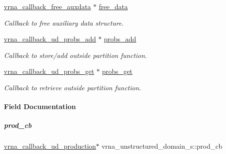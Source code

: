 \begin{DoxyCompactItemize}
\mbox{\hyperlink{group__fold__compound_ga7806651f51b195013839a218b3bbd5a3}{vrna\+\_\+callback\+\_\+free\+\_\+auxdata}} $\ast$ \mbox{\hyperlink{group__domains__up_a21b3084846902172858bc53f113d05a4}{free\+\_\+data}}
\begin{DoxyCompactList}\small\item\em Callback to free auxiliary data structure. \end{DoxyCompactList}\item 
\mbox{\label{group__domains__up_a457b43dfab7f4321b5d7a84e5deea5d7}} 
\mbox{\hyperlink{group__domains__up_gab10498abc84fcaf336aca8f8d7d42eb2}{vrna\+\_\+callback\+\_\+ud\+\_\+probs\+\_\+add}} $\ast$ \mbox{\hyperlink{group__domains__up_a457b43dfab7f4321b5d7a84e5deea5d7}{probs\+\_\+add}}
\begin{DoxyCompactList}\small\item\em Callback to store/add outside partition function. \end{DoxyCompactList}\item 
\mbox{\label{group__domains__up_a0b155283bccf65c5253f31e0211ae8ff}} 
\mbox{\hyperlink{group__domains__up_gaa10ba1b6f1e179ea84c5caca9cdaae67}{vrna\+\_\+callback\+\_\+ud\+\_\+probs\+\_\+get}} $\ast$ \mbox{\hyperlink{group__domains__up_a0b155283bccf65c5253f31e0211ae8ff}{probs\+\_\+get}}
\begin{DoxyCompactList}\small\item\em Callback to retrieve outside partition function. \end{DoxyCompactList}\end{DoxyCompactItemize}


\paragraph{Field Documentation}
\mbox{\label{group__domains__up_ac2656d57130ac56e85212836482cbe80}} 
\subparagraph{\texorpdfstring{prod\_cb}{prod\_cb}}
{\footnotesize\ttfamily \mbox{\hyperlink{group__domains__up_ga4fdfc02c1b660c07f2d887772f02a0a1}{vrna\+\_\+callback\+\_\+ud\+\_\+production}}$\ast$ vrna\+\_\+unstructured\+\_\+domain\+\_\+s\+::prod\+\_\+cb}



